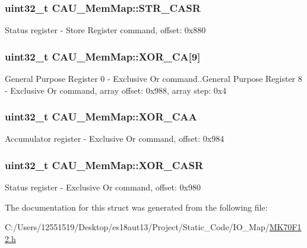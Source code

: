 \subsubsection[{S\+T\+R\+\_\+\+C\+A\+S\+R}]{\setlength{\rightskip}{0pt plus 5cm}uint32\+\_\+t C\+A\+U\+\_\+\+Mem\+Map\+::\+S\+T\+R\+\_\+\+C\+A\+S\+R}\label{struct_c_a_u___mem_map_ad90eef15bc61290af107c3d5871599a8}
Status register -\/ Store Register command, offset\+: 0x880 \hypertarget{struct_c_a_u___mem_map_acb520a0239533ff35af926264fd9a6a9}{}
\subsubsection[{X\+O\+R\+\_\+\+C\+A}]{\setlength{\rightskip}{0pt plus 5cm}uint32\+\_\+t C\+A\+U\+\_\+\+Mem\+Map\+::\+X\+O\+R\+\_\+\+C\+A\mbox{[}9\mbox{]}}\label{struct_c_a_u___mem_map_acb520a0239533ff35af926264fd9a6a9}
General Purpose Register 0 -\/ Exclusive Or command..General Purpose Register 8 -\/ Exclusive Or command, array offset\+: 0x988, array step\+: 0x4 \hypertarget{struct_c_a_u___mem_map_a5597e40ecdc9aaf07f342eea55467ff1}{}
\subsubsection[{X\+O\+R\+\_\+\+C\+A\+A}]{\setlength{\rightskip}{0pt plus 5cm}uint32\+\_\+t C\+A\+U\+\_\+\+Mem\+Map\+::\+X\+O\+R\+\_\+\+C\+A\+A}\label{struct_c_a_u___mem_map_a5597e40ecdc9aaf07f342eea55467ff1}
Accumulator register -\/ Exclusive Or command, offset\+: 0x984 \hypertarget{struct_c_a_u___mem_map_a9a390a748c987c883432ae79087640e2}{}
\subsubsection[{X\+O\+R\+\_\+\+C\+A\+S\+R}]{\setlength{\rightskip}{0pt plus 5cm}uint32\+\_\+t C\+A\+U\+\_\+\+Mem\+Map\+::\+X\+O\+R\+\_\+\+C\+A\+S\+R}\label{struct_c_a_u___mem_map_a9a390a748c987c883432ae79087640e2}
Status register -\/ Exclusive Or command, offset\+: 0x980 

The documentation for this struct was generated from the following file\+:\begin{DoxyCompactItemize}
\item 
C\+:/\+Users/12551519/\+Desktop/es18aut13/\+Project/\+Static\+\_\+\+Code/\+I\+O\+\_\+\+Map/\hyperlink{_m_k70_f12_8h}{M\+K70\+F12.\+h}\end{DoxyCompactItemize}
